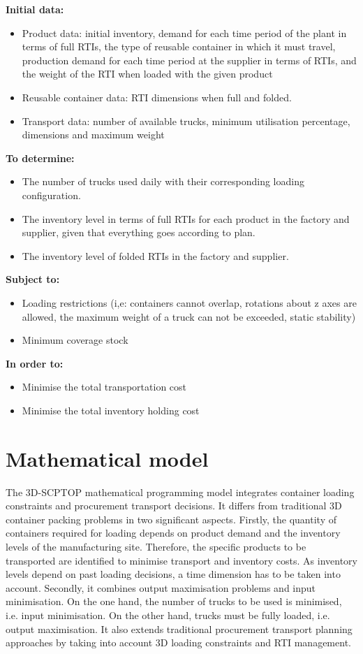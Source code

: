 \textbf{Initial data:}
\begin{itemize}
  \item Product data: initial inventory, demand for each time period of the plant in terms of full RTIs, the type of reusable container in which it must travel, production demand for each time period at the supplier in terms of RTIs, and the weight of the RTI when loaded with the given product
  \item Reusable container data: RTI dimensions when full and folded.
  \item Transport data: number of available trucks, minimum utilisation percentage, dimensions and maximum weight
\end{itemize}
\textbf{To determine:}
\begin{itemize}
  \item The number of trucks used daily with their corresponding loading configuration.
  \item The inventory level in terms of full RTIs for each product in the factory and supplier, given that everything goes according to plan.
  \item The inventory level of folded RTIs in the factory and supplier.
\end{itemize}
\textbf{Subject to:}
\begin{itemize}
  \item Loading restrictions (i,e: containers cannot overlap, rotations about z axes are allowed, the maximum weight of a truck can not be exceeded, static stability)
  \item Minimum coverage stock
\end{itemize}
\textbf{In order to:}
\begin{itemize}
  \item Minimise the total transportation cost
  \item Minimise the total inventory holding cost
\end{itemize}

\section{Mathematical model}
The 3D-SCPTOP mathematical programming model integrates container loading constraints and procurement transport decisions. It differs from  traditional 3D container packing problems in two significant aspects. Firstly, the quantity of containers required for loading depends on product demand and the inventory levels of the manufacturing site. Therefore, the specific products to be transported are identified to minimise transport and inventory costs. As inventory levels depend on past loading decisions, a time dimension has to be taken into account. Secondly, it combines output maximisation problems and input minimisation. On the one hand, the number of trucks to be used is minimised, i.e. input minimisation. On the other hand, trucks must be fully loaded, i.e. output maximisation. It also extends traditional procurement transport planning approaches by taking into account 3D loading constraints and RTI management.


